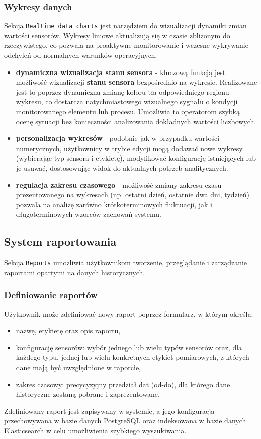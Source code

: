 \subsubsection{Wykresy danych}
Sekcja \texttt{Realtime data charts} jest narzędziem do wizualizacji dynamiki zmian wartości sensorów. Wykresy liniowe aktualizują się w czasie zbliżonym do rzeczywistego, co pozwala na proaktywne monitorowanie i wczesne wykrywanie odchyleń od normalnych warunków operacyjnych.
\begin{itemize}
    \item \textbf{dynamiczna wizualizacja stanu sensora} - kluczową funkcją jest możliwość wizualizacji \textbf{stanu sensora} bezpośrednio na wykresie. Realizowane jest to poprzez dynamiczną zmianę koloru tła odpowiedniego regionu wykresu, co dostarcza natychmiastowego wizualnego sygnału o kondycji monitorowanego elementu lub procesu. Umożliwia to operatorom szybką ocenę sytuacji bez konieczności analizowania dokładnych wartości liczbowych.
    \item \textbf{personalizacja wykresów} - podobnie jak w przypadku wartości numerycznych, użytkownicy w trybie edycji mogą dodawać nowe wykresy (wybierając typ sensora i etykietę), modyfikować konfigurację istniejących lub je usuwać, dostosowując widok do aktualnych potrzeb analitycznych.
    \item \textbf{regulacja zakresu czasowego} - możliwość zmiany zakresu czasu prezentowanego na wykresach (np. ostatni dzień, ostatnie dwa dni, tydzień) pozwala na analizę zarówno krótkoterminowych fluktuacji, jak i długoterminowych wzorców zachowań systemu.
\end{itemize}


\newpage

\subsection{System raportowania}
Sekcja \texttt{Reports} umożliwia użytkownikom tworzenie, przeglądanie i zarządzanie raportami opartymi na danych historycznych.

\subsubsection{Definiowanie raportów}
Użytkownik może zdefiniować nowy raport poprzez formularz, w którym określa:
\begin{itemize}
    \item nazwę, etykietę oraz opis raportu,
    \item konfigurację sensorów: wybór jednego lub wielu typów sensorów oraz, dla każdego typu, jednej lub wielu konkretnych etykiet pomiarowych, z których dane mają być uwzględnione w raporcie,
    \item zakres czasowy: precycyzyjny przedział dat (od-do), dla którego dane historyczne zostaną pobrane i zaprezentowane.
\end{itemize}
Zdefiniowany raport jest zapisywany w systemie, a jego konfiguracja przechowywana w bazie danych PostgreSQL oraz indeksowana w bazie danych Elasticsearch w celu umożliwienia szybkiego wyszukiwania.

